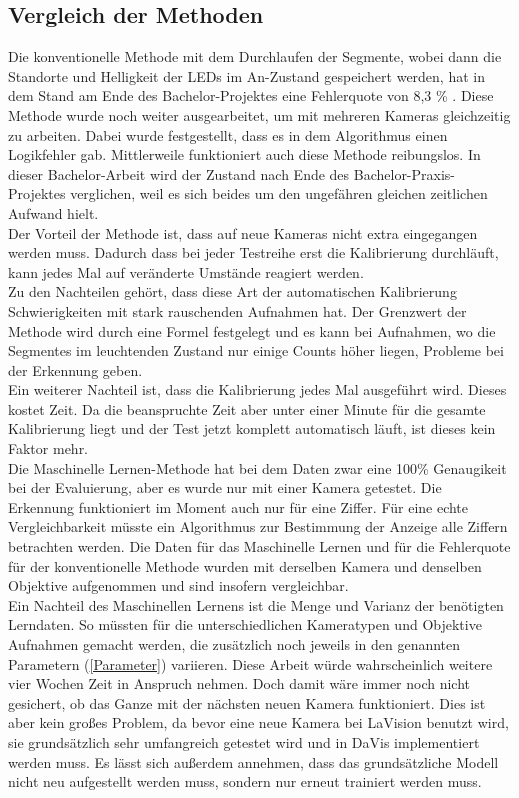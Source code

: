 \subsection{Vergleich der Methoden}
Die konventionelle Methode mit dem Durchlaufen der Segmente, wobei dann die Standorte und Helligkeit der LEDs im An-Zustand gespeichert werden,  hat in dem Stand am Ende des Bachelor-Projektes eine Fehlerquote von 8,3 \% \cite{Becker2021}.  Diese Methode wurde noch weiter ausgearbeitet, um mit mehreren Kameras gleichzeitig zu arbeiten.  Dabei wurde festgestellt, dass es in dem Algorithmus einen Logikfehler gab.  Mittlerweile funktioniert auch diese Methode reibungslos.  In dieser Bachelor-Arbeit wird der Zustand nach Ende des Bachelor-Praxis-Projektes verglichen, weil es sich beides um den ungefähren gleichen zeitlichen Aufwand hielt.\\
Der Vorteil der Methode ist, dass auf neue Kameras nicht extra eingegangen werden muss.  Dadurch dass bei jeder Testreihe erst die Kalibrierung durchläuft, kann jedes Mal auf veränderte Umstände reagiert werden. \\
Zu den Nachteilen gehört, dass diese Art der automatischen Kalibrierung Schwierigkeiten mit stark rauschenden Aufnahmen hat. Der Grenzwert der Methode wird durch eine Formel festgelegt und es kann bei Aufnahmen, wo die Segmentes im leuchtenden Zustand nur einige Counts höher liegen, Probleme bei der Erkennung geben. \\
Ein weiterer Nachteil ist, dass die Kalibrierung jedes Mal ausgeführt wird.  Dieses kostet Zeit. Da die beanspruchte Zeit aber unter einer Minute für die gesamte Kalibrierung liegt und der Test jetzt komplett automatisch läuft,  ist dieses kein Faktor mehr.\\
Die Maschinelle Lernen-Methode hat bei dem Daten zwar eine 100\% Genaugikeit bei der Evaluierung,  aber es wurde nur mit einer Kamera getestet. 
 Die Erkennung funktioniert im Moment auch nur für eine Ziffer. Für eine echte Vergleichbarkeit müsste ein Algorithmus zur Bestimmung der Anzeige alle Ziffern betrachten werden.  Die Daten für das Maschinelle Lernen und für die Fehlerquote für der konventionelle Methode wurden mit derselben Kamera und denselben Objektive aufgenommen und sind insofern vergleichbar.\\
Ein Nachteil des Maschinellen Lernens ist die Menge und Varianz der benötigten Lerndaten.  So müssten für die unterschiedlichen Kameratypen und Objektive Aufnahmen gemacht werden,  die zusätzlich noch jeweils in den genannten Parametern (\ref{Parameter}) variieren.  Diese Arbeit würde wahrscheinlich weitere vier Wochen Zeit in Anspruch nehmen. Doch damit wäre immer noch nicht gesichert, ob das Ganze mit der nächsten neuen Kamera funktioniert.  Dies ist aber kein großes Problem, da bevor eine neue Kamera bei LaVision benutzt wird,  sie grundsätzlich sehr umfangreich getestet wird und in DaVis implementiert werden muss.  Es lässt sich außerdem annehmen,  dass das grundsätzliche Modell nicht neu aufgestellt werden muss, sondern nur erneut trainiert werden muss.\\
